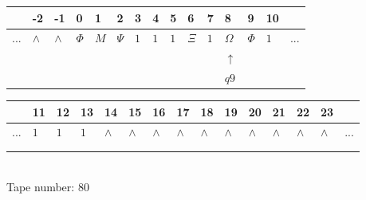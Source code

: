 \documentclass[11pt]{article}
\begin{document}
\begin{table}[H]
\centering
\begin{tabular}{lllllllllllllll}
 & -2 & -1 & 0 & 1 & 2 & 3 & 4 & 5 & 6 & 7 & 8 & 9 & 10 & \\
\hline
$...$ & \multicolumn{1}{|l|}{$\wedge$} & \multicolumn{1}{|l|}{$\wedge$} & \multicolumn{1}{|l|}{$\Phi$} & \multicolumn{1}{|l|}{$M$} & \multicolumn{1}{|l|}{$\Psi$} & \multicolumn{1}{|l|}{$1$} & \multicolumn{1}{|l|}{$1$} & \multicolumn{1}{|l|}{$1$} & \multicolumn{1}{|l|}{$\Xi$} & \multicolumn{1}{|l|}{$1$} & \multicolumn{1}{|l|}{$\Omega$} & \multicolumn{1}{|l|}{$\Phi$} & \multicolumn{1}{|l|}{$1$} & $...$\\
\hline
&  &  &  &  &  &  &  &  &  &  & $\uparrow$ &  &  &  \\
&  &  &  &  &  &  &  &  &  &  & $ q9 $ &  &  &  \\
\end{tabular}
\begin{tabular}{lllllllllllllll}
 & 11 & 12 & 13 & 14 & 15 & 16 & 17 & 18 & 19 & 20 & 21 & 22 & 23 & \\
\hline
$...$ & \multicolumn{1}{|l|}{$1$} & \multicolumn{1}{|l|}{$1$} & \multicolumn{1}{|l|}{$1$} & \multicolumn{1}{|l|}{$\wedge$} & \multicolumn{1}{|l|}{$\wedge$} & \multicolumn{1}{|l|}{$\wedge$} & \multicolumn{1}{|l|}{$\wedge$} & \multicolumn{1}{|l|}{$\wedge$} & \multicolumn{1}{|l|}{$\wedge$} & \multicolumn{1}{|l|}{$\wedge$} & \multicolumn{1}{|l|}{$\wedge$} & \multicolumn{1}{|l|}{$\wedge$} & \multicolumn{1}{|l|}{$\wedge$} & $...$\\
\hline
&  &  &  &  &  &  &  &  &  &  &  &  &  &  \\
&  &  &  &  &  &  &  &  &  &  &  &  &  &  \\
\end{tabular}
\\
Tape number: 80
\noindent\makebox[\linewidth]{\hdashrule{\textwidth}{1pt}{1pt}}\end{table}
\end{document}

